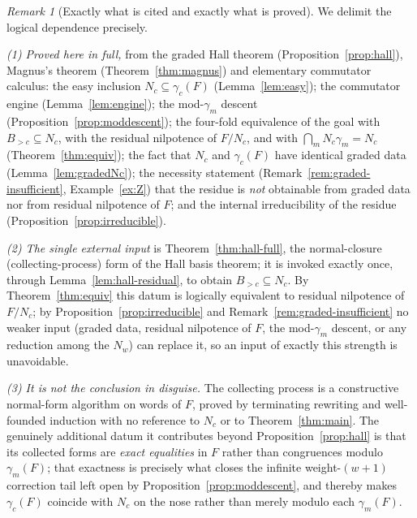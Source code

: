 \documentclass{amsart}
\theoremstyle{definition}
\theoremstyle{remark}
\newtheorem{remark}{Remark}
\begin{document}
\begin{remark}[Exactly what is cited and exactly what is proved]
\label{rem:noncircular}
We delimit the logical dependence precisely.

\emph{(1) Proved here in full,} from the graded Hall theorem
(Proposition~\ref{prop:hall}), Magnus's theorem (Theorem~\ref{thm:magnus}) and
elementary commutator calculus: the easy inclusion $N_c\subseteq\gamma_c(F)$
(Lemma~\ref{lem:easy}); the commutator engine (Lemma~\ref{lem:engine}); the
mod-$\gamma_m$ descent (Proposition~\ref{prop:moddescent}); the four-fold
equivalence of the goal with $B_{>c}\subseteq N_c$, with the residual nilpotence of
$F/N_c$, and with $\bigcap_m N_c\gamma_m=N_c$ (Theorem~\ref{thm:equiv}); the fact
that $N_c$ and $\gamma_c(F)$ have identical graded data (Lemma~\ref{lem:gradedNc});
the necessity statement (Remark~\ref{rem:graded-insufficient}, Example~\ref{ex:Z})
that the residue is \emph{not} obtainable from graded data nor from residual
nilpotence of $F$; and the internal irreducibility of the residue
(Proposition~\ref{prop:irreducible}).

\emph{(2) The single external input} is Theorem~\ref{thm:hall-full}, the
normal-closure (collecting-process) form of the Hall basis theorem; it is invoked
exactly once, through Lemma~\ref{lem:hall-residual}, to obtain
$B_{>c}\subseteq N_c$. By Theorem~\ref{thm:equiv} this datum is logically
equivalent to residual nilpotence of $F/N_c$; by
Proposition~\ref{prop:irreducible} and Remark~\ref{rem:graded-insufficient} no
weaker input (graded data, residual nilpotence of $F$, the mod-$\gamma_m$ descent,
or any reduction among the $N_w$) can replace it, so an input of exactly this
strength is unavoidable.

\emph{(3) It is not the conclusion in disguise.} The collecting process is a
constructive normal-form algorithm on words of $F$, proved by terminating
rewriting and well-founded induction with no reference to $N_c$ or to
Theorem~\ref{thm:main}. The genuinely additional datum it contributes beyond
Proposition~\ref{prop:hall} is that its collected forms are \emph{exact equalities}
in $F$ rather than congruences modulo $\gamma_m(F)$; that exactness is precisely
what closes the infinite weight-$(w{+}1)$ correction tail left open by
Proposition~\ref{prop:moddescent}, and thereby makes $\gamma_c(F)$ coincide with
$N_c$ on the nose rather than merely modulo each $\gamma_m(F)$.
\end{remark}
\end{document}
